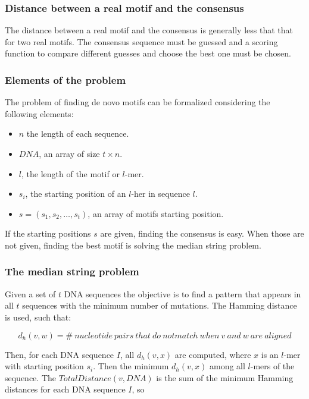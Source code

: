 		\subsubsection{Distance between a real motif and the consensus}
		The distance between a real motif and the consensus is generally less that that for two real motifs.
		The consensus sequence must be guessed and a scoring function to compare different guesses and choose the best one must be chosen.

		\subsubsection{Elements of the problem}
		The problem of finding de novo motifs can be formalized considering the following elements:

		\begin{multicols}{2}
			\begin{itemize}
				\item $n$ the length of each sequence.
				\item $DNA$, an array of size $t\times n$.
				\item $l$, the length of the motif or $l$-mer.
				\item $s_i$, the starting position of an $l$-her in sequence $l$.
				\item $s = (s_1, s_2, \dots, s_t)$, an array of motifs starting position.
			\end{itemize}
		\end{multicols}

		If the starting positions $s$ are given, finding the consensus is easy.
		When those are not given, finding the best motif is solving the median string problem.

		\subsubsection{The median string problem}
		Given a set of $t$ DNA sequences the objective is to find a pattern that appears in all $t$ sequences with the minimum number of mutations.
		The Hamming distance is used, such that:

		$$d_h(v, w) = \#\ nucleotide\ pairs\ that\ do\ not match\ when\ v\ and\ w\ are\ aligned$$

		Then, for each DNA sequence $I$, all $d_h(v,x)$ are computed, where $x$ is an $l$-mer with starting position $s_i$.
		Then the minimum $d_h(v,x)$ among all $l$-mers of the sequence.
		The $TotalDistance(v,DNA)$ is the sum of the minimum Hamming distances for each DNA sequence $I$, so


